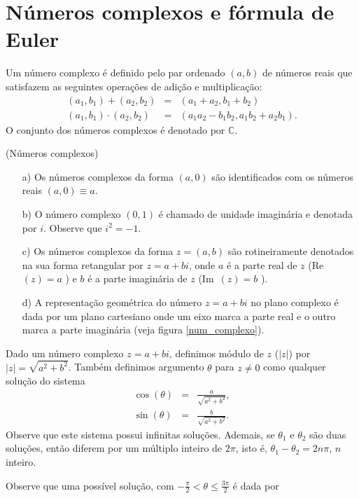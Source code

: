 \section{Números complexos e fórmula de Euler}
\begin{defn} Um número complexo é definido pelo par ordenado $(a,b)$ de números reais que satisfazem as seguintes operações de adição e multiplicação:
\begin{eqnarray*}
(a_1,b_1)+(a_2,b_2)&=&(a_1+a_2,b_1+b_2)\\
(a_1,b_1)\cdot(a_2,b_2)&=&(a_1a_2-b_1b_2,a_1b_2+a_2b_1).
\end{eqnarray*}
O conjunto dos números complexos é denotado por $\mathbb{C}$.
\end{defn}
\begin{obs}(Números complexos)
\begin{itemize} 
\item[a)] Os números complexos da forma $(a,0)$ são identificados com os números reais $(a,0)\equiv a$.
\item[b)] O número complexo $(0,1)$ é chamado de unidade imaginária e denotada por $i$. Observe que $i^2=-1$.
\item[c)] Os números complexos da forma $z=(a,b)$ são rotineiramente denotados na sua forma retangular por $z=a+bi$, onde $a$ é a parte real de $z$ (Re\ \!$(z)=a$ ) e $b$ é a parte imaginária de $z$ (Im\ \!$(z)=b$ ).
\item[d)] A representação geométrica do número $z=a+bi$ no plano complexo é dada por um plano cartesiano onde um eixo marca a parte real e o outro marca a parte imaginária (veja figura \ref{num_complexo}).
\end{itemize}
\end{obs}
\begin{defn}Dado um número complexo $z=a+bi$, definimos módulo de $z$ ($|z|$) por $|z|=\sqrt{a^2+b^2}$. Também definimos argumento $\theta$ para $z\neq 0$ como qualquer  solução do sistema
\begin{eqnarray}
 \cos(\theta)&=&\frac{a}{\sqrt{a^2+b^2}},\\
 \sin(\theta)&=&\frac{b}{\sqrt{a^2+b^2}}.
\end{eqnarray}
Observe que este sistema possui infinitas soluções. Ademais, se $\theta_1$ e $\theta_2$ são duas soluções, então diferem por um múltiplo inteiro de $2\pi$, isto é, $\theta_1-\theta_2=2n\pi$, $n$ inteiro.
\end{defn}
Observe que uma possível solução, com $-\frac{\pi}{2}<\theta\leq \frac{3\pi}{2}$ é dada por
